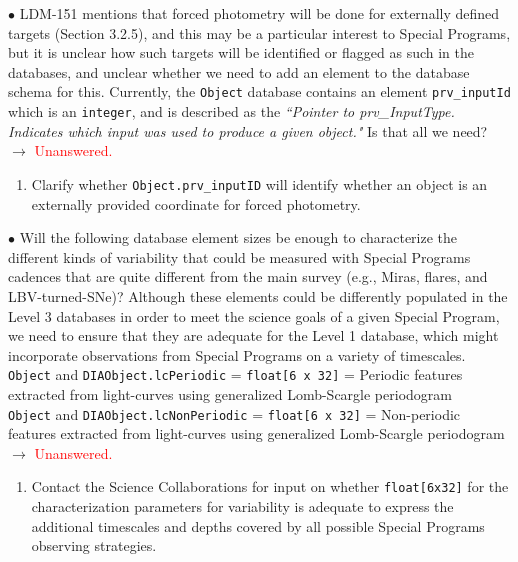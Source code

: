 \documentclass[DM,lsstdraft,toc]{lsstdoc}
\begin{document}
$\bullet$ LDM-151 mentions that forced photometry will be done for externally defined targets (Section 3.2.5), and this may be a particular interest to Special Programs, but it is unclear how such targets will be identified or flagged as such in the databases, and unclear whether we need to add an element to the database schema for this. Currently, the {\tt Object} database contains an element {\tt prv\_inputId} which is an {\tt integer}, and is described as the {\it ``Pointer to prv\_InputType. Indicates which input was used to produce a given object."} Is that all we need? \\
$\rightarrow$ \textcolor{red}{Unanswered.}
\begin{enumerate}[resume,topsep=-10pt,label= \textbf{Concern \Roman*.}] \item \label{C9} Clarify whether {\tt Object.prv\_inputID} will identify whether an object is an externally provided coordinate for forced photometry. \end{enumerate}

$\bullet$ Will the following database element sizes be enough to characterize the different kinds of variability that could be measured with Special Programs cadences that are quite different from the main survey (e.g., Miras, flares, and LBV-turned-SNe)? Although these elements could be differently populated in the Level 3 databases in order to meet the science goals of a given Special Program, we need to ensure that they are adequate for the Level 1 database, which might incorporate observations from Special Programs on a variety of timescales. \\
{\tt Object} and {\tt DIAObject.lcPeriodic} = {\tt float[6 x 32]} = Periodic features extracted from light-curves using generalized Lomb-Scargle periodogram \\
{\tt Object} and {\tt DIAObject.lcNonPeriodic} = {\tt float[6 x 32]} = Non-periodic features extracted from light-curves using generalized Lomb-Scargle periodogram \\
$\rightarrow$ \textcolor{red}{Unanswered.}
\begin{enumerate}[resume,topsep=-10pt,label= \textbf{Concern \Roman*.}] \item \label{C10} Contact the Science Collaborations for input on whether {\tt float[6x32]} for the characterization parameters for variability is adequate to express the additional timescales and depths covered by all possible Special Programs observing strategies. \end{enumerate}
\end{document}
